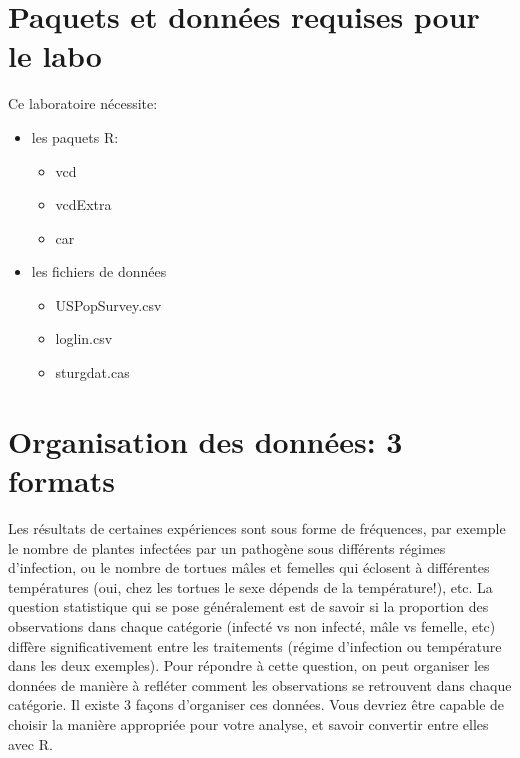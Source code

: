 \documentclass[12pt,]{book}
\providecommand{\tightlist}{%
  \setlength{\itemsep}{0pt}\setlength{\parskip}{0pt}}
\begin{document}
\hypertarget{set-freq}{%
\section{Paquets et données requises pour le labo}\label{set-freq}}

Ce laboratoire nécessite:

\begin{itemize}
\tightlist
\item
  les paquets R:

  \begin{itemize}
  \tightlist
  \item
    vcd
  \item
    vcdExtra
  \item
    car
  \end{itemize}
\item
  les fichiers de données

  \begin{itemize}
  \tightlist
  \item
    USPopSurvey.csv
  \item
    loglin.csv
  \item
    sturgdat.cas
  \end{itemize}
\end{itemize}

\hypertarget{organisation-des-donnuxe9es-3-formats}{%
\section{Organisation des données: 3 formats}\label{organisation-des-donnuxe9es-3-formats}}

Les résultats de certaines expériences sont sous forme de fréquences, par exemple le nombre de plantes infectées par un pathogène sous différents régimes d'infection, ou le nombre de tortues mâles et femelles qui éclosent à différentes températures (oui, chez les tortues le sexe dépends de la température!), etc. La question statistique qui se pose généralement est de savoir si la proportion des observations dans chaque catégorie (infecté vs non infecté, mâle vs femelle, etc) diffère significativement entre les traitements (régime d'infection ou température dans les deux exemples). Pour répondre à cette question, on peut organiser les données de manière à refléter comment les observations se retrouvent dans chaque catégorie. Il existe 3 façons d'organiser ces données. Vous devriez être capable de choisir la manière appropriée pour votre analyse, et savoir convertir entre elles avec R.
\end{document}
